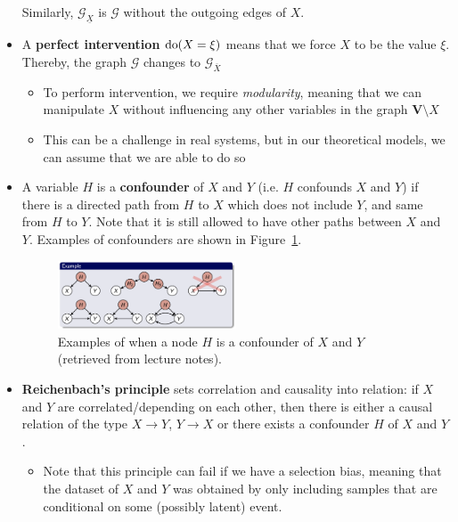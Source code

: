 \begin{itemize}
	Similarly, $\mathcal{G}_{\underline{X}}$ is $\mathcal{G}$ without the outgoing edges of $X$.
	\item  A \textbf{perfect intervention} $\textnormal{do}(X=\xi)$ means that we force $X$ to be the value $\xi$. Thereby, the graph $\mathcal{G}$ changes to $\mathcal{G}_{\overline{X}}$
	\begin{itemize}
		\item To perform intervention, we require \textit{modularity}, meaning that we can manipulate $X$ without influencing any other variables in the graph $\bm{V}\setminus X$
		\item This can be a challenge in real systems, but in our theoretical models, we can assume that we are able to do so
	\end{itemize}
	\item A variable $H$ is a \textbf{confounder} of $X$ and $Y$ (i.e. $H$ confounds $X$ and $Y$) if there is a directed path from $H$ to $X$ which does not include $Y$, and same from $H$ to $Y$. Note that it is still allowed to have other paths between $X$ and $Y$. Examples of confounders are shown in Figure~\ref{fig:causality_confounders_examples}.
	
	\begin{figure}[ht!]
		\centering
		\includegraphics[width=0.5\textwidth]{figures/causality_confounders_examples.png}
		\caption{Examples of when a node $H$ is a confounder of $X$ and $Y$ (retrieved from lecture notes).}
		\label{fig:causality_confounders_examples}
	\end{figure}

	\item \textbf{Reichenbach's principle} sets correlation and causality into relation: if $X$ and $Y$ are correlated/depending on each other, then there is either a causal relation of the type $X\to Y$, $Y\to X$ or there exists a confounder $H$ of $X$ and $Y$.
	\begin{itemize}
		\item Note that this principle can fail if we have a selection bias, meaning that the dataset of $X$ and $Y$ was obtained by only including samples that are conditional on some (possibly latent) event.
	\end{itemize}
\end{itemize}

